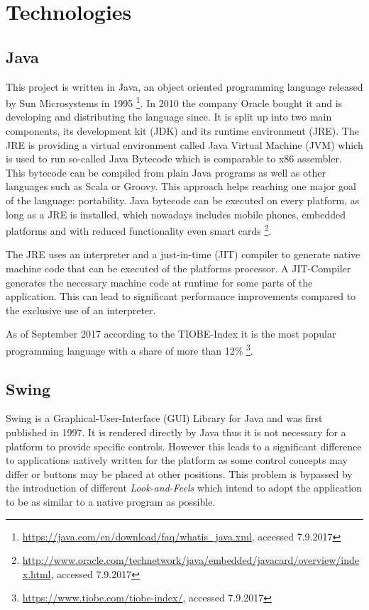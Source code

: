 \section{Technologies}
\subsection{Java}
This project is written in Java, an object oriented programming language released by Sun Microsystems in 1995  \footnote{\href{https://java.com/en/download/faq/whatis_java.xml}{https://java.com/en/download/faq/whatis\_java.xml}, accessed 7.9.2017}. In 2010 the company Oracle bought it and is developing and distributing the language since. It is split up into two main components, its development kit (JDK) and its runtime environment (JRE). The JRE is providing a virtual environment called Java Virtual Machine (JVM) which is used to run so-called Java Bytecode which is comparable to x86 assembler. This bytecode can be compiled from plain Java programs as well as other languages such as Scala or Groovy. 
This approach helps reaching one major goal of the language: portability. Java bytecode can be executed on every platform, as long as a JRE is installed, which nowadays includes mobile phones, embedded platforms and with reduced functionality even smart cards \footnote{\href{http://www.oracle.com/technetwork/java/embedded/javacard/overview/index.html}{http://www.oracle.com/technetwork/java/embedded/javacard/overview/index.html}, accessed 7.9.2017}. 

The JRE uses an interpreter and a just-in-time (JIT) compiler to generate native machine code that can be executed of the platforms processor. A JIT-Compiler generates the necessary machine code at runtime for some parts of the application. This can lead to significant performance improvements compared to the exclusive use of an interpreter.

As of September 2017 according to the TIOBE-Index it is the most popular programming language with a share of more than 12\% \footnote{\href{https://www.tiobe.com/tiobe-index/}{https://www.tiobe.com/tiobe-index/}, accessed 7.9.2017}. 
\subsection{Swing}

Swing is a Graphical-User-Interface (GUI) Library for Java and was first published in 1997. It is rendered directly by Java thus it is not necessary for a platform to provide specific controls. However this leads to a significant difference to applications natively written for the platform as some control concepts may differ or buttons may be placed at other positions. This problem is bypassed by the introduction of different \emph{Look-and-Feels} which intend to adopt the application to be as similar to a native program as possible.


